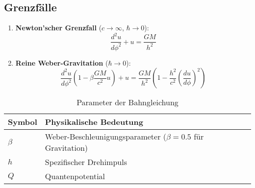 \subsection{Grenzfälle}
\begin{enumerate}
\item \textbf{Newton'scher Grenzfall} ($c\to\infty$, $\hbar\to0$):
\begin{equation}
\frac{d^2u}{d\phi^2} + u = \frac{GM}{h^2}
\end{equation}

\item \textbf{Reine Weber-Gravitation} ($\hbar\to0$):
\begin{equation}
\frac{d^2u}{d\phi^2}\left(1-\beta\frac{GM}{c^2}u\right) + u = \frac{GM}{h^2}\left(1-\frac{h^2}{c^2}\left(\frac{du}{d\phi}\right)^2\right)
\end{equation}
\end{enumerate}

\begin{table}[h]
\centering
\caption{Parameter der Bahngleichung}
\begin{tabular}{ll}
\hline
Symbol & Physikalische Bedeutung \\ \hline
$\beta$ & Weber-Beschleunigungsparameter ($\beta=0.5$ für Gravitation) \\
$h$ & Spezifischer Drehimpuls \\
$Q$ & Quantenpotential \\
\hline
\end{tabular}
\end{table}
